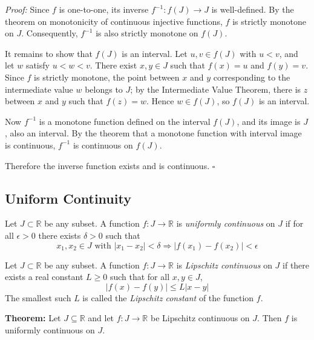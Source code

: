 \documentclass[a4paper,11pt,abstracton]{scrartcl}
\newcommand{\RR}{\mathbb{R}}
\theoremstyle{dotlessP}
\theoremstyle{dotlessS}
\theoremstyle{remark}
\theoremstyle{definition}
\begin{document}
\begin{claim_box}
\textit{Proof:}
Since $f$ is one-to-one, its inverse $f^{-1}:f(J)\to J$ is well-defined. By the theorem on monotonicity of continuous injective functions, $f$ is strictly monotone on $J$. Consequently, $f^{-1}$ is also strictly monotone on $f(J)$.

It remains to show that $f(J)$ is an interval. Let $u,v\in f(J)$ with $u<v$, and let $w$ satisfy $u<w<v$. There exist $x,y\in J$ such that $f(x)=u$ and $f(y)=v$. Since $f$ is strictly monotone, the point between $x$ and $y$ corresponding to the intermediate value $w$ belongs to $J$; by the Intermediate Value Theorem, there is $z$ between $x$ and $y$ such that $f(z)=w$. Hence $w\in f(J)$, so $f(J)$ is an interval.

Now $f^{-1}$ is a monotone function defined on the interval $f(J)$, and its image is $J$, also an interval. By the theorem that a monotone function with interval image is continuous, $f^{-1}$ is continuous on $f(J)$.

Therefore the inverse function exists and is continuous.
\hfill$\square$
\end{claim_box}

\subsection{Uniform Continuity}

\begin{definition_box}
Let $J \subset \RR$ be any subset. A function $f:J \rightarrow \RR$ is \emph{uniformly continuous} on $J$ if for all $\epsilon > 0$ there exists $\delta > 0$ such that 
\[
x_1,x_2 \in J \text{ with } |x_1-x_2|<\delta \Rightarrow |f(x_1)-f(x_2)| < \epsilon
\]
\end{definition_box}

\begin{definition_box}
Let $J \subset \RR$ be any subset. A function $f:J \rightarrow \RR$ is \emph{Lipschitz continuous} on $J$ if there exists a real constant $L \geq 0$ such that for all $x,y \in J$,
\[
|f(x)-f(y)| \leq L|x-y|
\]
The smallest such $L$ is called the \emph{Lipschitz constant} of the function $f$.
\end{definition_box}

\begin{problem_box}
\textbf{Theorem:}
Let $J\subseteq\RR$ and let $f:J\to\RR$ be Lipschitz continuous on $J$. Then $f$ is uniformly continuous on $J$.
\end{problem_box}
\end{document}

